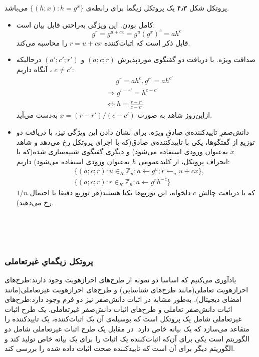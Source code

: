 \proposition
پروتکل شکل ۴٫۳ یک پروتکل زیگما برای رابطه‌ی 
$\{ (h;x) : h=g^x \}$
می‌باشد.
~
\\
\begin{itemize}
\item{کامل بودن.}
این ویژگی به‌راحتی قابل بیان است:
$$g^r = g^{u+cx} = g^u(g^x)^c = ah^c$$
قابل ذکر است که اثبات‌کننده 
$r = u+cx$
‌را محاسبه می‌کند.
\item{صداقت ویژه.}
با دریافت دو گفتگوی موردپذیرش 
$(a;c;r)$
و
$(a';c';r')$
درحالیکه
$c \neq c'$
، آنگاه داریم:
\begin{align}
 &\quad ~~ g^r = ah^c, g^{r'} = ah^{c'} \\
 & \Rightarrow g^{r-r'} = h^{c-c'}\\
 & \Longleftrightarrow h = \frac{r-r'}{c-c'}
\end{align}
ازاین‌روز شاهد به صورت 
$ x = (r-r') / (c-c') $
 به‌دست می‌آید.
\item{دانش‌صفرِ تاییدکننده‌ی صادقِ ویژه.}
برای نشان دادن این ویژگی نیز، با دریافت دو توزیع از گفتگوها، یکی با تاییدکننده‌ی صادق(که با اجرای پروتکل رخ می‌دهد و شاهد 
$x$
به‌عنوان ورودی استفاده می‌شود) و دیگری گفتگوی شبیه‌سازی شده(که با انحراف پروتکل، از کلیدعمومی
$h$
به‌عنوان ورودی استفاده می‌شود) داریم:
\begin{align}
& \{ (a;c;r) : u \in_R \mathbb{Z}_n ; a \leftarrow g^u ; r {\leftarrow}_n u+cx \},\\
& \{ (a;c;r) : r \in_R \mathbb{Z}_n ; a \leftarrow g^rh^{-c} \}
\end{align} 
که با دریافت چالش
$c$
دلخواه، این توزیع‌ها یکتا هستند(هر توزیع دقیقا با احتمال
$1/n$
رخ می‌دهند). 
\end{itemize}~
\\
\\
\\
\subsubsection{پروتکل زیگماي غیرتعاملی}\label{non_interactive_sigma_protocol}

یادآوری می‌کنیم که اساسا دو نمونه از طرح‌های احرازهویت وجود دارند:طرح‌های احرازهویت تعاملی(مانند طرح‌های شناسایی) و طرح‌های احرازهویت غیرتعاملی(مانند امضای دیجیتال). 
به‌طور مشابه در اثبات دانش‌صفر نیز دو فرم وجود دارد:طرح‌های اثبات دانش‌صفر تعاملی و طرح‌های اثبات دانش‌صفر غیرتعاملی.
یک طرح اثبات غیرتعاملی شامل یک پروتکل است که بوسیله‌ی آن یک اثبات‌کننده، یک تاییدکننده را متقاعد می‌سازد که یک بیانه خاص دارد. در مقابل یک طرح اثبات غیرتعاملی شامل دو الگوریتم است  یکی برای آن‌که اثبات‌کننده یک اثبات را برای یک بیانه خاص تولید کند و  الگوریتم دیگر برای آن است که تاییدکننده صحت اثبات داده شده را بررسی کند. 
\\

